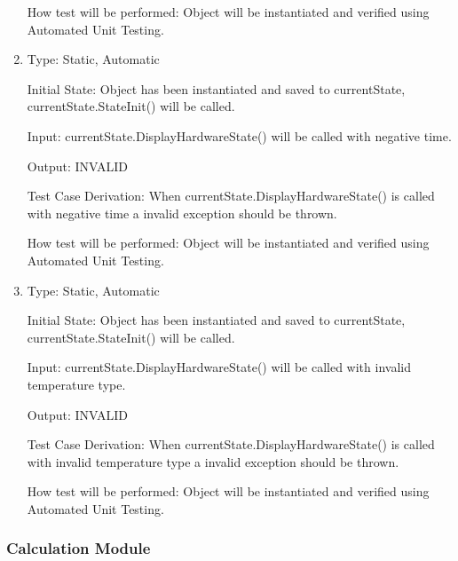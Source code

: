 \documentclass[12pt, titlepage]{article}
\begin{document}
\begin{enumerate}[{UT-CS}1.]
How test will be performed: Object will be instantiated and verified using Automated Unit Testing.

\item

Type: Static, Automatic
					
Initial State: Object has been instantiated and saved to currentState, currentState.StateInit() will be called.
					
Input: currentState.DisplayHardwareState() will be called with negative time.
					
Output: INVALID

Test Case Derivation: When currentState.DisplayHardwareState() is called with negative time a invalid exception should be thrown.

How test will be performed: Object will be instantiated and verified using Automated Unit Testing.


\item

Type: Static, Automatic
					
Initial State: Object has been instantiated and saved to currentState, currentState.StateInit() will be called.
					
Input: currentState.DisplayHardwareState() will be called with invalid temperature type.
					
Output: INVALID

Test Case Derivation: When currentState.DisplayHardwareState() is called with invalid temperature type a invalid exception should be thrown.

How test will be performed: Object will be instantiated and verified using Automated Unit Testing.
    
\end{enumerate}

\subsubsection{Calculation Module }
\end{document}
